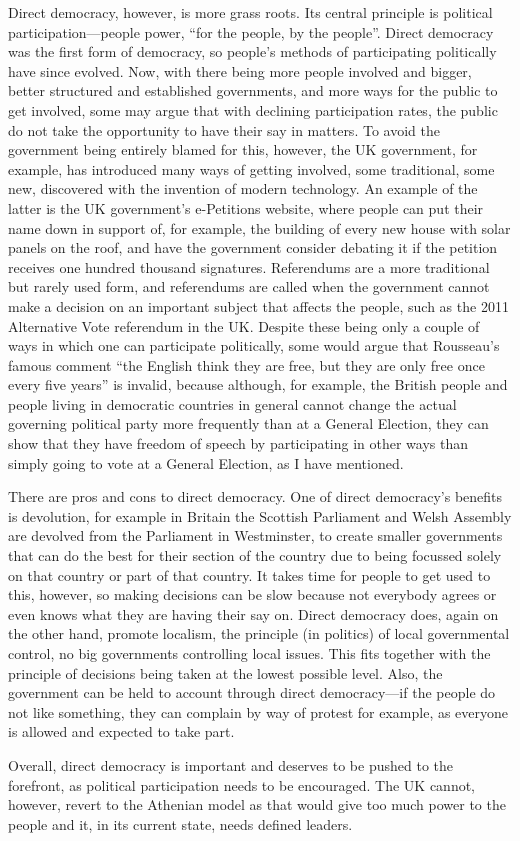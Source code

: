 \documentclass[12pt,a4paper]{article}
\begin{document}
Direct democracy, however, is more grass roots.  Its central principle is political participation---people power, ``for the people, by the people''.  Direct democracy was the first form of democracy, so people's methods of participating politically have since evolved.  Now, with there being more people involved and bigger, better structured and established governments, and more ways for the public to get involved, some may argue that with declining participation rates, the public do not take the opportunity to have their say in matters.  To avoid the government being entirely blamed for this, however, the UK government, for example, has introduced many ways of getting involved, some traditional, some new, discovered with the invention of modern technology.  An example of the latter is the UK government's e-Petitions website, where people can put their name down in support of, for example, the building of every new house with solar panels on the roof, and have the government consider debating it if the petition receives one hundred thousand signatures.  Referendums are a more traditional but rarely used form, and referendums are called when the government cannot make a decision on an important subject that affects the people, such as the 2011 Alternative Vote referendum in the UK.  Despite these being only a couple of ways in which one can participate politically, some would argue that Rousseau's famous comment ``the English think they are free, but they are only free once every five years'' is invalid, because although, for example, the British people and people living in democratic countries in general cannot change the actual governing political party more frequently than at a General Election, they can show that they have freedom of speech by participating in other ways than simply going to vote at a General Election, as I have mentioned.

There are pros and cons to direct democracy.  One of direct democracy's benefits is devolution, for example in Britain the Scottish Parliament and Welsh Assembly are devolved from the Parliament in Westminster, to create smaller governments that can do the best for their section of the country due to being focussed solely on that country or part of that country.  It takes time for people to get used to this, however, so making decisions can be slow because not everybody agrees or even knows what they are having their say on.  Direct democracy does, again on the other hand, promote localism, the principle (in politics) of local governmental control, no big governments controlling local issues.  This fits together with the principle of decisions being taken at the lowest possible level.  Also, the government can be held to account through direct democracy---if the people do not like something, they can complain by way of protest for example, as everyone is allowed and expected to take part.

Overall, direct democracy is important and deserves to be pushed to the forefront, as political participation needs to be encouraged.  The UK cannot, however, revert to the Athenian model as that would give too much power to the people and it, in its current state, needs defined leaders.
\end{document}
